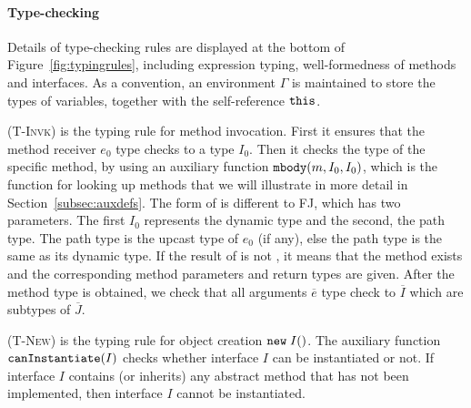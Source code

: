 \paragraph{Type-checking}
Details of type-checking rules are displayed at the bottom of Figure~\ref{fig:typingrules}, including expression
typing, well-formedness of methods and interfaces. As a convention, an environment
$\Gamma$ is maintained to store the types of variables, together with
the self-reference $\texttt{this}$.

\textsc{(T-Invk)} is the typing rule for method invocation.
 First it ensures that the method
receiver $e_0$ type checks to a type $I_0$. Then it checks the type of
the specific method, by using an auxiliary function $\texttt{mbody}(m, I_0,
I_0)$, which is the function for looking up methods that we will
illustrate in more detail in Section~\ref{subsec:auxdefs}. The form of
\mbody{} is different to FJ, which has two parameters. The first $I_0$
represents the dynamic type and the second, the path type. The path type is the upcast type of $e_0$ (if any), else the path type is the same as its dynamic type. If the result of \mbody{} is not \Undefined, it means that the method exists and the corresponding method parameters and return types are given. After the method type is obtained, we check that all arguments $\overline{e}$ type check to $\overline{I}$ which are subtypes of $\overline{J}$. 

\textsc{(T-New)} is the typing rule for object creation $\texttt{new} \; I()$. The auxiliary function $\texttt{canInstantiate}(I)$ checks whether interface $I$ can be instantiated or not. If interface $I$ contains (or inherits) any abstract method that has not been implemented, then interface $I$ cannot be instantiated.

